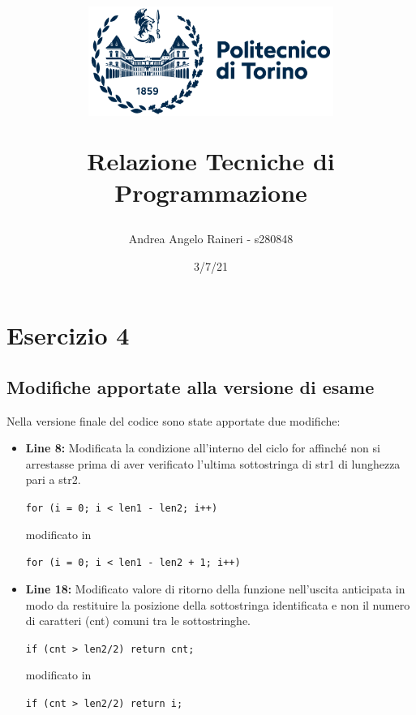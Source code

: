 \documentclass[11pt, a4paper, titlepage]{article}
\newcommand{\code}[1]{\colorbox{light-gray}{\texttt{#1}}}
\begin{document}
    \title{
        \begin{figure}[t]
            \includegraphics[width=8cm]{logo.png}
            \centering
        \end{figure}
            \textbf{Relazione Tecniche di Programmazione}
        }
    \author{Andrea Angelo Raineri - s280848}
    \date{3/7/21}
    \maketitle

    \section{Esercizio 4}

        \subsection{Modifiche apportate alla versione di esame}
            Nella versione finale del codice sono state apportate due modifiche:
                \begin{itemize}
                    \item \textbf{Line 8:} Modificata la condizione all'interno del ciclo for 
                    affinché non si arrestasse prima di aver verificato l'ultima sottostringa 
                    di str1 di lunghezza pari a str2.
                      
                        \code{for (i = 0; i < len1 - len2; i++)}

                        modificato in

                        \code{for (i = 0; i < len1 - len2 + 1; i++)}
                        
                    \item \textbf{Line 18:} Modificato valore di ritorno della funzione 
                    nell'uscita anticipata in modo da restituire la posizione 
                    della sottostringa identificata e non il numero di caratteri (cnt) 
                    comuni tra le sottostringhe.

                        \code{if (cnt > len2/2)
                        return cnt;}

                        modificato in

                        \code{if (cnt > len2/2)
                        return i;}
                \end{itemize}
        
\end{document}
